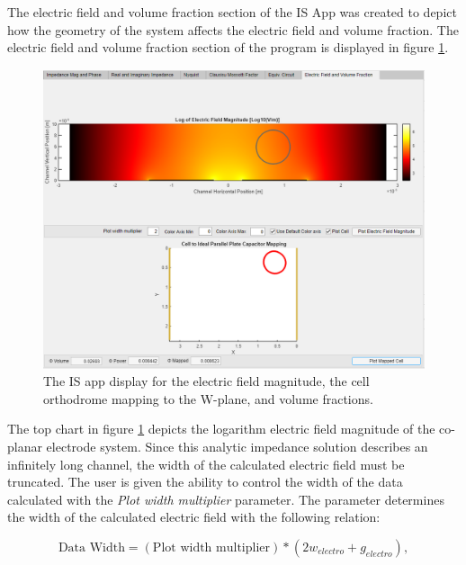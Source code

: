\par The electric field and volume fraction section of the IS App was created to depict how the geometry of the system affects the electric field and volume fraction. The electric field and volume fraction section of the program is displayed in figure \ref{fig:is_app_Efield_volume_fraction}. 

\begin{figure}[h]
    \centering
    \includegraphics[width=\textwidth]{images/impedanceDisplayEFieldVFs.png}
    \caption[IS app display of the electric field and volume fraction.]{The IS app display for the electric field magnitude, the cell orthodrome mapping to the W-plane, and volume fractions.}
    \label{fig:is_app_Efield_volume_fraction}
\end{figure}

\par The top chart in figure \ref{fig:is_app_Efield_volume_fraction} depicts the logarithm electric field magnitude of the co-planar electrode system. Since this analytic impedance solution describes an infinitely long channel, the width of the calculated electric field must be truncated. The user is given the ability to control the width of the data calculated with the \textit{Plot width multiplier} parameter. The parameter determines the width of the calculated electric field with the following relation:

\begin{equation*}
        \text{Data Width} = (\text{Plot width multiplier})*(2w_{electro} + g_{electro}),
\end{equation*}

